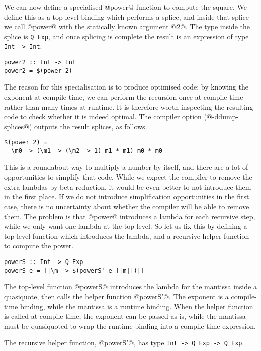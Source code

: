 We can now define a specialised @power@ function to compute the square.
We define this as a top-level binding which performs a splice, and inside that splice we call @power@ with the statically known argument @2@.
The type inside the splice is \lstinline/Q Exp/, and once splicing is complete the result is an expression of type \lstinline/Int -> Int/.

\begin{lstlisting}
power2 :: Int -> Int
power2 = $(power 2)
\end{lstlisting}

The reason for this specialisation is to produce optimised code: by knowing the exponent at compile-time, we can perform the recursion once at compile-time rather than many times at runtime.
It is therefore worth inspecting the resulting code to check whether it is indeed optimal.
The compiler option (@-ddump-splices@) outputs the result splices, as follows.

\begin{lstlisting}
$(power 2) =
  \m0 -> (\m1 -> (\m2 -> 1) m1 * m1) m0 * m0
\end{lstlisting}

This is a roundabout way to multiply a number by itself, and there are a lot of opportunities to simplify that code.
While we expect the compiler to remove the extra lambdas by beta reduction, it would be even better to not introduce them in the first place.
If we do not introduce simplification opportunities in the first case, there is no uncertainty about whether the compiler will be able to remove them.
The problem is that @power@ introduces a lambda for each recursive step, while we only want one lambda at the top-level.
So let us fix this by defining a top-level function which introduces the lambda, and a recursive helper function to compute the power.

\begin{lstlisting}
powerS :: Int -> Q Exp
powerS e = [|\m -> $(powerS' e [|m|])|]
\end{lstlisting}

The top-level function @powerS@ introduces the lambda for the mantissa inside a quasiquote, then calls the helper function @powerS'@.
The exponent is a compile-time binding, while the mantissa is a runtime binding.
When the helper function is called at compile-time, the exponent can be passed as-is, while the mantissa must be quasiquoted to wrap the runtime binding into a compile-time expression.

The recursive helper function, @powerS'@, has type \lstinline/Int -> Q Exp -> Q Exp/.

